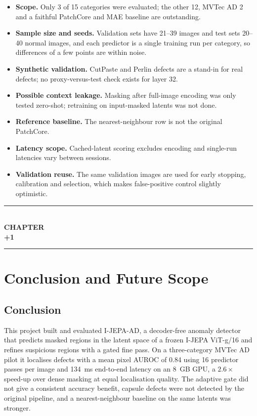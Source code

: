 \documentclass[12pt,a4paper,oneside]{report}
\newcommand{\chapterseparator}{
    \clearpage
    \thispagestyle{empty}
    \begin{center}
        \vspace*{5cm}
        \rule{0.65\textwidth}{0.5pt}\\[1.2cm]
        {\fontsize{16}{20}\selectfont\bfseries CHAPTER}\\[0.8cm]
        {\fontsize{24}{28}\selectfont\bfseries \the\numexpr\value{chapter}+1\relax}\\[1.2cm]
        \rule{0.65\textwidth}{0.5pt}
    \end{center}
    \clearpage
}
\begin{document}
\begin{itemize}[leftmargin=*]
    \item \textbf{Scope.} Only 3 of 15 categories were evaluated; the other
    12, MVTec AD 2 and a faithful PatchCore and MAE baseline are outstanding.
    \item \textbf{Sample size and seeds.} Validation sets have 21--39 images
    and test sets 20--40 normal images, and each predictor is a single
    training run per category, so differences of a few points are within
    noise.
    \item \textbf{Synthetic validation.} CutPaste and Perlin defects are a
    stand-in for real defects; no proxy-versus-test check exists for layer
    32.
    \item \textbf{Possible context leakage.} Masking after full-image
    encoding was only tested zero-shot; retraining on input-masked latents
    was not done.
    \item \textbf{Reference baseline.} The nearest-neighbour row is not the
    original PatchCore.
    \item \textbf{Latency scope.} Cached-latent scoring excludes encoding and
    single-run latencies vary between sessions.
    \item \textbf{Validation reuse.} The same validation images are used for
    early stopping, calibration and selection, which makes false-positive
    control slightly optimistic.
\end{itemize}

\chapterseparator
\chapter{Conclusion and Future Scope}

\section{Conclusion}

This project built and evaluated I-JEPA-AD, a decoder-free anomaly detector
that predicts masked regions in the latent space of a frozen I-JEPA ViT-g/16
and refines suspicious regions with a gated fine pass. On a three-category
MVTec AD pilot it localises defects with a mean pixel AUROC of 0.84 using 16
predictor passes per image and 134~ms end-to-end latency on an 8~GB GPU, a
$2.6\times$ speed-up over dense masking at equal localisation quality. The
adaptive gate did not give a consistent accuracy benefit, capsule defects
were not detected by the original pipeline, and a nearest-neighbour baseline
on the same latents was stronger.
\end{document}
